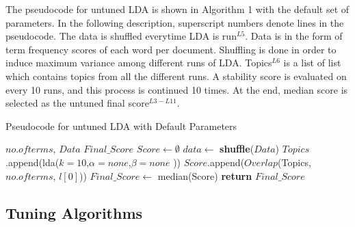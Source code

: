 \documentclass[conference]{IEEEtran}
\theoremstyle{break}
\begin{document}
The pseudocode for untuned LDA is shown in Algorithm 1 with the default set of parameters. In the following description, superscript numbers denote lines in the pseudocode. The data is shuffled everytime LDA is run$^{L5}$. Data is in the form of term frequency scores of each word per document. Shuffling is done in order  to  induce  maximum  variance  among  different  runs of LDA. Topics$^{L6}$ is a list of list which contains topics from all the different runs. A stability score is evaluated on every 10 runs, and this process is continued 10 times. At the end, median score is selected as the untuned final score$^{L3-L11}$.

\makeatletter
\algrenewcommand\ALG@beginalgorithmic{\footnotesize}
\algrenewcommand{}
\makeatother
\renewcommand{\algorithmicrequire}{\textbf{Input:}}
\renewcommand{\algorithmicensure}{\textbf{Output:}}
\begin{algorithm}[!htbp]
    \caption{Pseudocode for untuned LDA with Default Parameters}
    \begin{algorithmic}[1]
    \Require $no. of terms$, $Data$
    \Ensure $Final\_Score$    
        \State $Score \leftarrow \emptyset$
                \State $data \leftarrow$ \textbf{shuffle}($Data$)
                \State $Topics$.append(lda($k=10$,$\alpha=none$,$\beta=none$ ))
            \EndFor
            \State $Score$.append($Overlap$(Topics, $no. of terms$, $l[0]$))
        \EndFor
        \State $Final\_Score \leftarrow $ median(Score)
        \State \textbf{return} $Final\_Score$
    \EndFunction
    \end{algorithmic}
\end{algorithm}

\subsection{Tuning Algorithms}
\label{sect: tuning}
\end{document}
